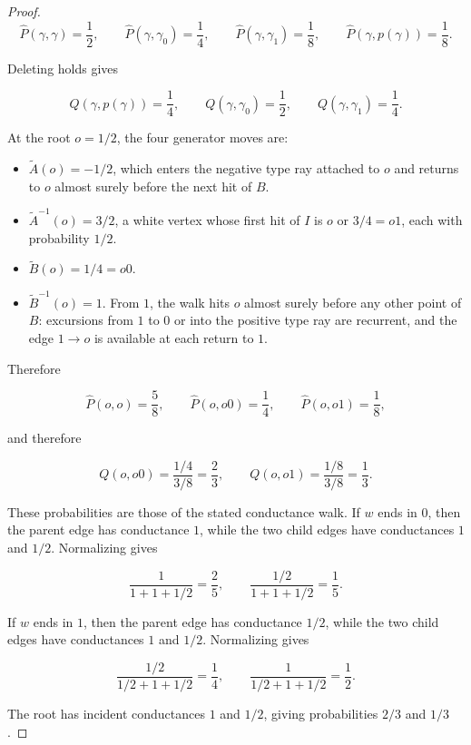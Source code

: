 \documentclass[10pt,a4paper]{amsart}
\begin{document}
\begin{proof}
\[
\widehat P(\gamma,\gamma)=\frac12,
\qquad
\widehat P(\gamma,\gamma_0)=\frac14,
\qquad
\widehat P(\gamma,\gamma_1)=\frac18,
\qquad
\widehat P(\gamma,p(\gamma))=\frac18 .
\]

Deleting holds gives

\[
Q(\gamma,p(\gamma))=\frac14,
\qquad
Q(\gamma,\gamma_0)=\frac12,
\qquad
Q(\gamma,\gamma_1)=\frac14 .
\]

At the root \(o=1/2\), the four generator moves are:

\begin{itemize}[leftmargin=*]
\item \(\widetilde A(o)=-1/2\), which enters the negative type ray attached to
  \(o\) and returns to \(o\) almost surely before the next hit of \(B\).
\item \(\widetilde A^{-1}(o)=3/2\), a white vertex whose first hit of \(I\) is
  \(o\) or \(3/4=o1\), each with probability \(1/2\).
\item \(\widetilde B(o)=1/4=o0\).
\item \(\widetilde B^{-1}(o)=1\). From \(1\), the walk hits \(o\) almost surely
  before any other point of \(B\): excursions from \(1\) to \(0\) or into the
  positive type ray are recurrent, and the edge \(1\to o\) is available at
  each return to \(1\).
\end{itemize}

Therefore

\[
\widehat P(o,o)=\frac58,
\qquad
\widehat P(o,o0)=\frac14,
\qquad
\widehat P(o,o1)=\frac18,
\]

and therefore

\[
Q(o,o0)=\frac{1/4}{3/8}=\frac23,
\qquad
Q(o,o1)=\frac{1/8}{3/8}=\frac13 .
\]

These probabilities are those of the stated conductance walk. If
\(w\) ends in \(0\), then the parent edge has conductance \(1\), while the two
child edges have conductances \(1\) and \(1/2\). Normalizing gives

\[
\frac{1}{1+1+1/2}=\frac25,
\qquad
\frac{1/2}{1+1+1/2}=\frac15 .
\]

If \(w\) ends in \(1\), then the parent edge has conductance \(1/2\), while
the two child edges have conductances \(1\) and \(1/2\). Normalizing gives

\[
\frac{1/2}{1/2+1+1/2}=\frac14,
\qquad
\frac{1}{1/2+1+1/2}=\frac12 .
\]

The root has incident conductances \(1\) and \(1/2\), giving probabilities
\(2/3\) and \(1/3\).
\end{proof}
\end{document}
